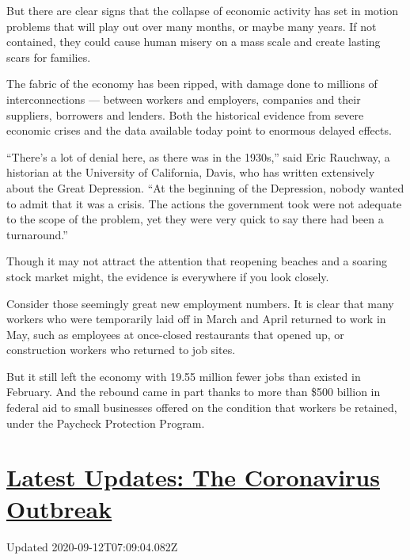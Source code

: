 But there are clear signs that the collapse of economic activity has set
in motion problems that will play out over many months, or maybe many
years. If not contained, they could cause human misery on a mass scale
and create lasting scars for families.

The fabric of the economy has been ripped, with damage done to millions
of interconnections --- between workers and employers, companies and
their suppliers, borrowers and lenders. Both the historical evidence
from severe economic crises and the data available today point to
enormous delayed effects.

``There's a lot of denial here, as there was in the 1930s,'' said Eric
Rauchway, a historian at the University of California, Davis, who has
written extensively about the Great Depression. ``At the beginning of
the Depression, nobody wanted to admit that it was a crisis. The actions
the government took were not adequate to the scope of the problem, yet
they were very quick to say there had been a turnaround.''

Though it may not attract the attention that reopening beaches and a
soaring stock market might, the evidence is everywhere if you look
closely.

Consider those seemingly great new employment numbers. It is clear that
many workers who were temporarily laid off in March and April returned
to work in May, such as employees at once-closed restaurants that opened
up, or construction workers who returned to job sites.

But it still left the economy with 19.55 million fewer jobs than existed
in February. And the rebound came in part thanks to more than \$500
billion in federal aid to small businesses offered on the condition that
workers be retained, under the Paycheck Protection Program.

\hypertarget{latest-updates-the-coronavirus-outbreak}{%
\section{\texorpdfstring{\href{https://www.nytimes3xbfgragh.onion/2020/09/11/world/covid-19-coronavirus.html?action=click\&pgtype=Article\&state=default\&region=MAIN_CONTENT_1\&context=storylines_live_updates}{Latest
Updates: The Coronavirus
Outbreak}}{Latest Updates: The Coronavirus Outbreak}}\label{latest-updates-the-coronavirus-outbreak}}

Updated 2020-09-12T07:09:04.082Z

